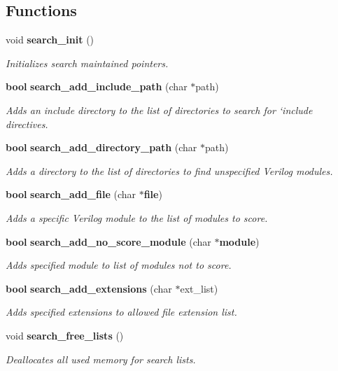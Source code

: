 \subsection*{Functions}
\begin{CompactItemize}
\item 
void {\bf search\_\-init} ()
\begin{CompactList}\small\item\em Initializes search maintained pointers.\item\end{CompactList}\item 
{\bf bool} {\bf search\_\-add\_\-include\_\-path} (char $\ast$path)
\begin{CompactList}\small\item\em Adds an include directory to the list of directories to search for `include directives.\item\end{CompactList}\item 
{\bf bool} {\bf search\_\-add\_\-directory\_\-path} (char $\ast$path)
\begin{CompactList}\small\item\em Adds a directory to the list of directories to find unspecified Verilog modules.\item\end{CompactList}\item 
{\bf bool} {\bf search\_\-add\_\-file} (char $\ast${\bf file})
\begin{CompactList}\small\item\em Adds a specific Verilog module to the list of modules to score.\item\end{CompactList}\item 
{\bf bool} {\bf search\_\-add\_\-no\_\-score\_\-module} (char $\ast${\bf module})
\begin{CompactList}\small\item\em Adds specified module to list of modules not to score.\item\end{CompactList}\item 
{\bf bool} {\bf search\_\-add\_\-extensions} (char $\ast$ext\_\-list)
\begin{CompactList}\small\item\em Adds specified extensions to allowed file extension list.\item\end{CompactList}\item 
void {\bf search\_\-free\_\-lists} ()
\begin{CompactList}\small\item\em Deallocates all used memory for search lists.\item\end{CompactList}\end{CompactItemize}

